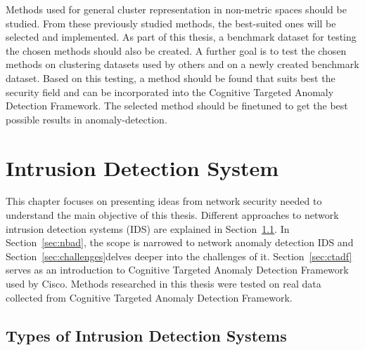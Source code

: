 \documentclass[thesis=B,english]{FITthesis}[2012/10/20]
\begin{document}
Methods used for general cluster representation in non-metric spaces should be studied.
From these previously studied methods, the best-suited ones will be selected and implemented.
As part of this thesis, a benchmark dataset for testing the chosen methods should also be created.
A further goal is to test the chosen methods on clustering datasets used by others and on a newly created benchmark dataset.
Based on this testing, a method should be found that suits best the security field and can be incorporated into the Cognitive Targeted Anomaly Detection Framework.
The selected method should be finetuned to get the best possible results in anomaly-detection.



\chapter{Intrusion Detection System}\label{ch:ids}

This chapter focuses on presenting ideas from network security needed to understand the main objective of this thesis.
Different approaches to network intrusion detection systems (IDS) are explained in Section~\ref{sec:ids}.
In Section~\ref{sec:nbad}, the scope is narrowed to network anomaly detection IDS and Section~\ref{sec:challenges}delves deeper into the challenges of it.
Section~\ref{sec:ctadf} serves as an introduction to Cognitive Targeted Anomaly Detection Framework used by Cisco.
Methods researched in this thesis were tested on real data collected from Cognitive Targeted Anomaly Detection Framework.

\section{Types of Intrusion Detection Systems}\label{sec:ids}
\end{document}
